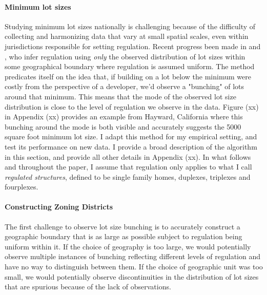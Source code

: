 \documentclass[11pt]{article}
\begin{document}
	 \paragraph*{Minimum lot sizes}
	 Studying minimum lot sizes nationally is challenging because of the difficulty of collecting and harmonizing data that vary at small spatial scales, even within jurisdictions responsible for setting regulation. Recent progress been made in \cite{Song} and \cite{Cui}, who infer regulation using \textit{only} the observed distribution of lot sizes within some geographical boundary where regulation is assumed uniform. The method predicates itself on the idea that, if building on a lot below the minimum were costly from the perspective of a developer, we'd observe a "bunching" of lots around that minimum. This means that the mode of the observed lot size distribution is close to the level of regulation we observe in the data. Figure (xx) in Appendix (xx) provides an example from Hayward, California where this bunching around the mode is both visible and accurately suggests the 5000 square foot minimum lot size. I adapt this method for my empirical setting, and test its performance on new data. I provide a broad description of the algorithm in this section, and provide all other details in Appendix (xx). In what follows and throughout the paper, I assume that regulation only applies to what I call \textit{regulated structures}, defined to be single family homes, duplexes, triplexes and fourplexes. 
	 
	 \paragraph*{Constructing Zoning Districts} The first challenge to observe lot size bunching is to accurately construct a geographic boundary that is as large as possible subject to regulation being uniform within it. If the choice of geography is too large, we would potentially observe multiple instances of bunching reflecting different levels of regulation and have no way to distinguish between them. If the choice of geographic unit was too small, we would potentially observe discontinuities in the distribution of lot sizes that are spurious because of the lack of observations.
\end{document}
